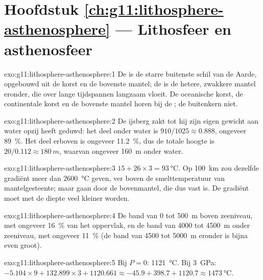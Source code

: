 \section*{Hoofdstuk \ref{ch:g11:lithosphere-asthenosphere} --- Lithosfeer en asthenosfeer}

\begin{solution}{exo:g11:lithosphere-asthenosphere:1}
De  is de starre buitenste schil van de Aarde, opgebouwd uit de korst
en de bovenste mantel; de  is de hetere, zwakkere mantel eronder,
die over lange tijdspannen langzaam vloeit. De oceanische korst, de continentale
korst en de bovenste mantel horen bij de ; de buitenkern
niet.
\end{solution}

\begin{solution}{exo:g11:lithosphere-asthenosphere:2}
De ijsberg zakt tot hij zijn eigen gewicht aan water opzij heeft geduwd: het deel
onder water is $910/1025 \approx 0.888$, ongeveer \qty{89}{\percent}.
Het deel erboven is ongeveer \qty{11.2}{\percent}, dus de totale hoogte is
$20/0.112 \approx \qty{180}{m}$, waarvan ongeveer \qty{160}{m} onder
water.
\end{solution}

\begin{solution}{exo:g11:lithosphere-asthenosphere:3}
$15 + 26 \times 3 = \qty{93}{\celsius}$. Op \qty{100}{km} zou dezelfde gradiënt
meer dan \qty{2600}{\celsius} geven, ver boven de smelttemperatuur van
mantelgesteente; maar  gaan door de bovenmantel, die dus vast is.
De gradiënt moet met de diepte veel kleiner worden.
\end{solution}

\begin{solution}{exo:g11:lithosphere-asthenosphere:4}
De band van 0 tot \qty{500}{m} boven zeeniveau, met ongeveer
\qty{16}{\percent} van het oppervlak, en de band van 4000 tot \qty{4500}{m}
onder zeeniveau, met ongeveer \qty{11}{\percent} (de band van 4500 tot
\qty{5000}{m} eronder is bijna even groot).
\end{solution}

\begin{solution}{exo:g11:lithosphere-asthenosphere:5}
Bij $P = 0$: \qty{1121}{\celsius}. Bij \qty{3}{GPa}: $-5.104 \times 9 +
132.899 \times 3 + 1120.661 \approx -45.9 + 398.7 + 1120.7 \approx
\qty{1473}{\celsius}$.
\end{solution}

